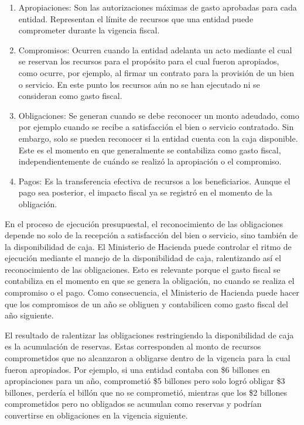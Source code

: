 \begin{enumerate}
    \item Apropiaciones: Son las autorizaciones máximas de gasto aprobadas para cada entidad. Representan el límite de recursos que una entidad puede comprometer durante la vigencia fiscal.
    \item Compromisos: Ocurren cuando la entidad adelanta un acto mediante el cual se reservan los recursos para el propósito para el cual fueron apropiados, como ocurre, por ejemplo, al firmar un contrato para la provisión de un bien o servicio. En este punto los recursos aún no se han ejecutado ni se consideran como gasto fiscal.
    \item Obligaciones: Se generan cuando se debe reconocer un monto adeudado, como por ejemplo cuando se recibe a satisfacción el bien o servicio contratado. Sin embargo, solo se pueden reconocer si la entidad cuenta con la caja disponible. Este es el momento en que generalmente se contabiliza como gasto fiscal, independientemente de cuándo se realizó la apropiación o el compromiso.
    \item Pagos: Es la transferencia efectiva de recursos a los beneficiarios. Aunque el pago sea posterior, el impacto fiscal ya se registró en el momento de la obligación.
\end{enumerate}

En el proceso de ejecución presupuestal, el reconocimiento de las obligaciones depende no solo de la recepción a satisfacción del bien o servicio, sino también de la disponibilidad de caja. El Ministerio de Hacienda puede controlar el ritmo de ejecución mediante el manejo de la disponibilidad de caja, ralentizando así el reconocimiento de las obligaciones. Esto es relevante porque el gasto fiscal se contabiliza en el momento en que se genera la obligación, no cuando se realiza el compromiso o el pago. Como consecuencia, el Ministerio de Hacienda puede hacer que los compromisos de un año se obliguen y contabilicen como gasto fiscal del año siguiente.




El resultado de ralentizar las obligaciones restringiendo la disponibilidad de caja es la acumulación de reservas. Estas corresponden al monto de recursos comprometidos que no alcanzaron a obligarse dentro de la vigencia para la cual fueron apropiados. Por ejemplo, si una entidad contaba con \$6 billones en apropiaciones para un año, comprometió \$5 billones pero solo logró obligar \$3 billones, perdería el billón que no se comprometió, mientras que los \$2 billones comprometidos pero no obligados se acumulan como reservas y podrían convertirse en obligaciones en la vigencia siguiente. 

